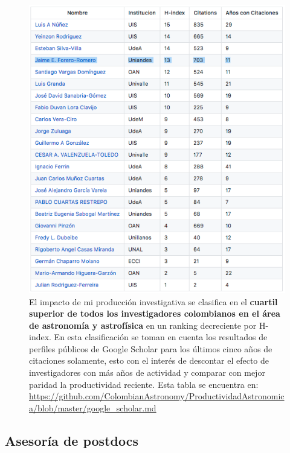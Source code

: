 \documentclass{article}
\begin{document}
\begin{figure}[!h]
\begin{center}
\includegraphics[scale=0.5]{scholar_astronomia.png}
\caption{
El impacto de mi producci\'on investigativa se clasifica en el {\bf cuartil
  superior de todos los investigadores colombianos en el \'area de
  astronom\'ia y astrof\'isica} en 
  un ranking decreciente por H-index. 
  En esta clasificaci\'on se toman en cuenta los resultados de
  perfiles p\'ublicos de Google Scholar
  para los \'ultimos cinco a\~nos de citaciones solamente, esto con el
  inter\'es de descontar el efecto de investigadores con m\'as a\~nos de
  actividad y comparar con mejor paridad la productividad
  reciente. 
Esta tabla se encuentra en: 
\url{https://github.com/ColombianAstronomy/ProductividadAstronomica/blob/master/google_scholar.md}
\label{table:astro}}
\end{center}
\end{figure}

\newpage

\subsection{Asesor\'ia de postdocs}
\end{document}
